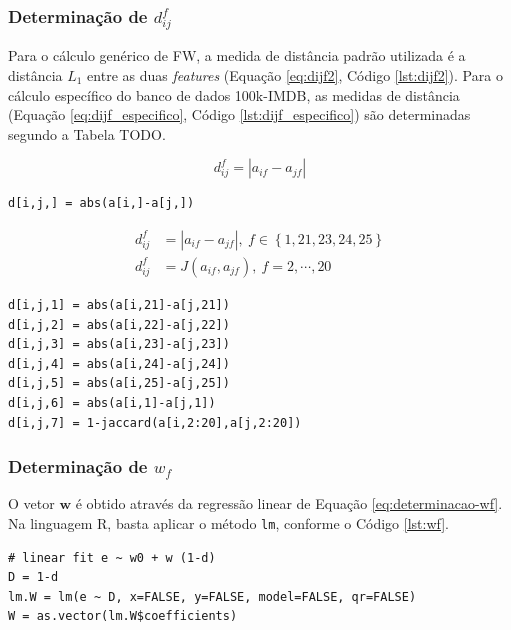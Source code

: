 \subsubsection{Determinação de $d_{ij}^f$} %
\label{ssub:determina_o_de_d__ij_f_}

Para o cálculo genérico de FW, a medida de distância padrão utilizada é a distância $L_1$ entre as duas \textit{features} (Equação \ref{eq:dijf2}, Código \ref{lst:dijf2}). Para o cálculo específico do banco de dados 100k-IMDB, as medidas de distância (Equação \ref{eq:dijf_especifico}, Código \ref{lst:dijf_especifico}) são determinadas segundo a Tabela TODO. 

\begin{equation}
\label{eq:dijf2}
d_{ij}^f = \left|a_{if} - a_{jf}\right|
\end{equation}

\begin{lstlisting}[caption=Determinação de $d_{ij}^f$ genérico,label=lst:dijf2]
d[i,j,] = abs(a[i,]-a[j,])
\end{lstlisting}

\begin{equation}
\label{eq:dijf_especifico}
\begin{split}
d_{ij}^f &= \left|a_{if} - a_{jf}\right|,~f \in \left\{1,21,23,24,25\right\} \\
d_{ij}^f &= J(a_{if},a_{jf}),~f = 2, \cdots, 20
\end{split}
\end{equation}


\begin{lstlisting}[caption=Determinação de $d_{ij}^f$ específico,label=lst:dijf_especifico]
d[i,j,1] = abs(a[i,21]-a[j,21])  
d[i,j,2] = abs(a[i,22]-a[j,22])  
d[i,j,3] = abs(a[i,23]-a[j,23])  
d[i,j,4] = abs(a[i,24]-a[j,24])  
d[i,j,5] = abs(a[i,25]-a[j,25])  
d[i,j,6] = abs(a[i,1]-a[j,1])    
d[i,j,7] = 1-jaccard(a[i,2:20],a[j,2:20])
\end{lstlisting}

\subsubsection{Determinação de $w_f$} %
\label{ssub:determina_o_de_w_f_}

O vetor $\mathbf{w}$ é obtido através da regressão linear de Equação \ref{eq:determinacao-wf}. Na linguagem R, basta aplicar o método \texttt{lm}, conforme  o Código \ref{lst:wf}.


\begin{lstlisting}[caption=Determinação de $w_f$,label=lst:wf]
# linear fit e ~ w0 + w (1-d)
D = 1-d
lm.W = lm(e ~ D, x=FALSE, y=FALSE, model=FALSE, qr=FALSE)
W = as.vector(lm.W$coefficients)
\end{lstlisting}

